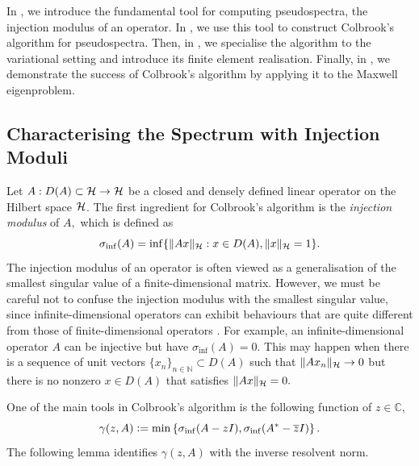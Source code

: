 In , we introduce the fundamental tool for computing pseudospectra, the injection modulus of an operator. In , we use this tool to construct Colbrook's algorithm for pseudospectra. Then, in , we specialise the algorithm to the variational setting and introduce its finite element realisation. Finally, in , we demonstrate the success of Colbrook's algorithm by applying it to the Maxwell eigenproblem. 


\subsection{Characterising the Spectrum with Injection Moduli} \label{ModSec}
Let $A: D(A) \subset \mathcal{H} \rightarrow \mathcal{H}$ be a closed and densely defined linear operator on the Hilbert space $\mathcal{H}$. The first ingredient for Colbrook's algorithm is the \textit{injection modulus} of $A,$ which is defined as
\begin{equation} \label{inject}
    \sigma_{\inf}(A) = \inf\{ \|Ax\|_{\mathcal{H}} : x \in D(A), \|x\|_{\mathcal{H}} = 1\}.
\end{equation}
The injection modulus of an operator is often viewed as a generalisation of the smallest singular value of a finite-dimensional matrix. However, we must be careful not to confuse the injection modulus with the smallest singular value, since infinite-dimensional operators can exhibit behaviours that are quite different from those of finite-dimensional operators \cite[Section 1.2.3]{Matt}. For example, an infinite-dimensional operator $A$ can be injective but have $\sigma_{\inf}(A)=0.$ This may happen when there is a sequence of unit vectors $\{x_n\}_{n \in \mathbb{N}} \subset D(A)$ such that $\|A x_n \|_{\mathcal{H}} \rightarrow 0$ but there is no nonzero $x \in D(A)$ that satisfies $\|Ax\|_{\mathcal{H}}=0.$ 

One of the main tools in Colbrook's algorithm is the following function of $z 
\in \mathbb{C},$
\begin{equation}
    \gamma(z, A) \vcentcolon= \min \left\{ \sigma_{\inf}(A-zI), \sigma_{\inf}(A^* - \overline{z}I) \right\}.
\end{equation}
The following lemma identifies  $\gamma(z, A)$ with the inverse resolvent norm.

